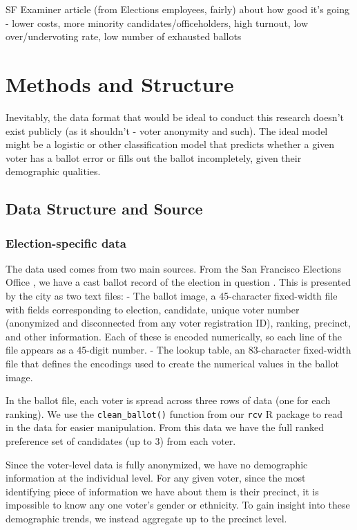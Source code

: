 \documentclass[12pt,twoside]{reedthesis}
\theoremstyle{definition}
\theoremstyle{definition}
\theoremstyle{definition}
\theoremstyle{remark}
\begin{document}
SF Examiner article (from Elections employees, fairly) about how good
it's going - lower costs, more minority candidates/officeholders, high
turnout, low over/undervoting rate, low number of exhausted ballots

\hypertarget{methods}{%
\chapter{Methods and Structure}\label{methods}}

Inevitably, the data format that would be ideal to conduct this research
doesn't exist publicly (as it shouldn't - voter anonymity and such). The
ideal model might be a logistic or other classification model that
predicts whether a given voter has a ballot error or fills out the
ballot incompletely, given their demographic qualities.

\hypertarget{data-structure-and-source}{%
\section{Data Structure and Source}\label{data-structure-and-source}}

\hypertarget{election-specific-data}{%
\subsection{Election-specific data}\label{election-specific-data}}

The data used comes from two main sources. From the San Francisco
Elections Office , we have a cast ballot record of the election in
question . This is presented by the city as two text files: - The ballot
image, a 45-character fixed-width file with fields corresponding to
election, candidate, unique voter number (anonymized and disconnected
from any voter registration ID), ranking, precinct, and other
information. Each of these is encoded numerically, so each line of the
file appears as a 45-digit number. - The lookup table, an 83-character
fixed-width file that defines the encodings used to create the numerical
values in the ballot image.

In the ballot file, each voter is spread across three rows of data (one
for each ranking). We use the \texttt{clean\_ballot()} function from our
\texttt{rcv} R package to read in the data for easier manipulation. From
this data we have the full ranked preference set of candidates (up to 3)
from each voter.

Since the voter-level data is fully anonymized, we have no demographic
information at the individual level. For any given voter, since the most
identifying piece of information we have about them is their precinct,
it is impossible to know any one voter's gender or ethnicity. To gain
insight into these demographic trends, we instead aggregate up to the
precinct level.
\end{document}
